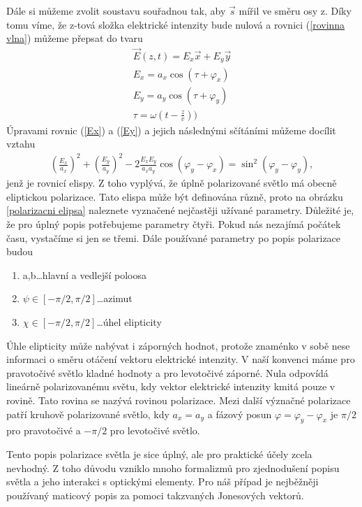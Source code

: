 Dále si můžeme zvolit soustavu souřadnou tak, aby $\vec{s}$ mířil ve směru osy z. Díky tomu víme, že z-tová složka elektrické intenzity bude nulová a rovnici (\ref{rovinna vlna}) můžeme  přepsat do tvaru
\begin{eqnarray}
\vec{E}(z,t)=E_x\vec{x}+E_y\vec{y} \\
E_x=a_x\cos(\tau+\varphi_x) \label{Ex}\\
E_y=a_y\cos(\tau+\varphi_y) \label{Ey}\\
\tau=\omega(t-\frac{z}{v}))
\end{eqnarray}
Úpravami rovnic (\ref{Ex}) a (\ref{Ey}) a jejich následnými sčítáními můžeme docílit vztahu
\begin{eqnarray}
\left(\frac{E_x}{a_x}\right)^2+\left(\frac{E_y}{a_y}\right)^2-2\frac{E_xE_y}{a_xa_y}\cos(\varphi_y-\varphi_x)=\sin^2(\varphi_y-\varphi_y),
\end{eqnarray}
jenž je rovnicí elispy. Z toho vyplývá, že úplně polarizované světlo má obecně eliptickou polarizace. Tato elispa může být definována různě, proto na obrázku \ref{polarizacni elipsa} naleznete vyznačené nejčastěji užívané parametry. Důležité je, že pro úplný popis potřebujeme parametry čtyři. Pokud nás nezajímá počátek času, vystačíme si jen se třemi. Dále používané parametry po popis polarizace budou
\begin{enumerate}
\item a,b\dots hlavní a vedlejší poloosa
\item $\psi\in[-\pi/2,\pi/2]$\dots azimut
\item $\chi\in[-\pi/2,\pi/2]$\dots úhel elipticity
\end{enumerate}
Úhle elipticity může nabývat i záporných hodnot, protože znaménko v sobě nese informaci o směru otáčení vektoru elektrické intenzity. V naší konvenci máme pro pravotočivé světlo kladné hodnoty a pro levotočivé záporné. Nula odpovídá lineárně polarizovanému světu, kdy vektor elektrické intenzity kmitá pouze v rovině. Tato rovina se nazývá rovinou polarizace. Mezi další význačné polarizace patří kruhově polarizované světlo, kdy $a_x=a_y$ a fázový posun $\varphi=\varphi_y-\varphi_x$ je $\pi/2$ pro pravotočivé a $-\pi/2$ pro levotočivé světlo.

Tento popis polarizace světla je sice úplný, ale pro praktické účely zcela nevhodný. Z toho důvodu vzniklo mnoho formalizmů pro zjednodušení popisu světla a jeho interakci s optickými elementy. Pro náš případ je nejběžněji používaný maticový popis za pomoci takzvaných Jonesových vektorů.

